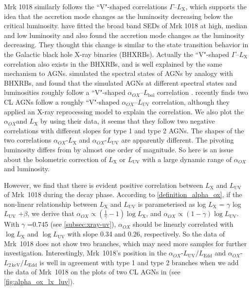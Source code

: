 \documentclass[twocolumn]{aastex63}
\newcommand{\alphaox}{$\alpha_{OX}$}
\begin{document}
Mrk 1018 similarly follows the ``V"-shaped correlations $\Gamma$--$L_\mathrm{X}$, which supports the idea that the accretion mode changes as the luminosity decreasing below the critical luminosity. \citet{2018MNRAS.480.3898N} have fitted the broad band SEDs of Mrk 1018 at high, median and low luminosity and also found the accretion mode changes as the luminosity decreasing. They thought this change is similar to the state transition behavior in the Galactic black hole X-ray binaries (BHXRBs). Actually the ``V"-shaped $\Gamma$--$L_\mathrm{X}$ correlation also exists in the BHXRBs, and is well explained by the same mechanism to AGNs\citep{2011A&A...530A.149Y,2015MNRAS.447.1692Y}. \citet{2011MNRAS.413.2259S} simulated the spectral states of AGNs by analogy with BHXRBs, and found that the simulated AGNs at different spectral states and luminosities roughly follow a ``V"-shaped \alphaox--$L_\mathrm{bol}$ correlation \citep[see also in ][]{2019ApJ...883...76R}. \citet{2019arXiv190904676R} recently finds two CL AGNs follow a roughly ``V"-shaped \alphaox--$L_\mathrm{UV}$ correlation, although they applied an X-ray reprocessing model to explain the correlation. We also plot the \alphaox and $L_\mathrm{X}$ by using their data, it seems that they follow two negative correlations with different slopes for type 1 and type 2 AGNs. The shapes of the two correlations \alphaox-$L_\mathrm{X}$ and \alphaox-$L_\mathrm{UV}$ are apparently different. The pivoting luminosity differs from \citet{2011ApJ...739...64X} by almost one order of magnitude. So here is an issue about the bolometric correction of $L_\mathrm{X}$ or $L_\mathrm{UV}$ with a large dynamic range of \alphaox and luminosity. 

 However, we find that there is evident positive correlation between $L_\mathrm{X}$ and $L_\mathrm{UV}$ of Mrk~1018 during the decay phase. According to \autoref{definition_alpha_ox}, if the non-linear relationship between $ L_{\mathrm{X}}$ and $ L_\mathrm{UV}$ is parameterised as log $L_\mathrm{X}$ = $\gamma $ log $L_{\mathrm{UV}} $ +$\beta$, we derive that $\alpha_{OX}\propto (\frac{1}{\gamma}-1) \log L_\mathrm{X}$, and $\alpha_{OX}\propto (1-\gamma) \log L_\mathrm{UV}$. With $\gamma$ =0.745 (see \autoref{subsec:xray-uv}), $\alpha_{OX}$ should be linearly correlated with $\log L_\mathrm{X}$ and $\log L_\mathrm{UV}$ with slope 0.34 and 0.26, respectively. So the data of Mrk~1018 does not show two branches, which may need more samples for further investigation. Interestingly, Mrk~1018's position in the \alphaox-$L_\mathrm{UV}/L_\mathrm{Edd}$ and \alphaox-$L_\mathrm{2\,keV}/L_\mathrm{Edd}$ is well in agreement with type 1 and type 2 branches when we add the data of Mrk~1018 on the plots of two CL AGNs in \citet{2019arXiv190904676R} (see \autoref{fig:alpha_ox_lx_luv}).
 
\end{document}
